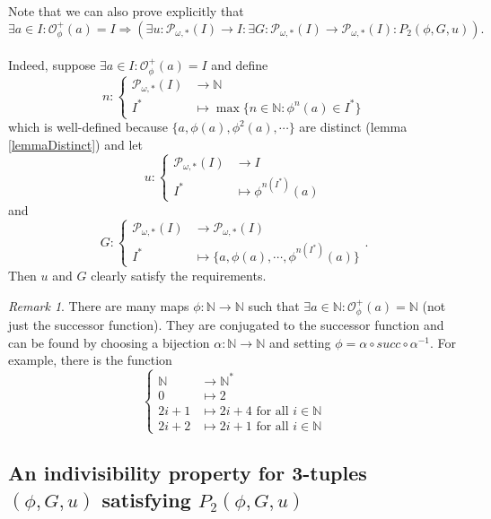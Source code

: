 \documentclass[a4paper,11pt]{article}
\theoremstyle{plain}
\theoremstyle{definition}
\theoremstyle{remark}
\newtheorem{remark}{Remark}[section]
\begin{document}
Note that we can also prove explicitly that 
\[ \exists a \in I : \mathcal{O}^{+}_\phi(a) = I \Rightarrow \left( \exists u : \mathcal{P}_{\omega,*}(I) \to I : \exists G : \mathcal{P}_{\omega,*}(I) \to \mathcal{P}_{\omega,*}(I) : P_2(\phi,G,u) \right). \] \\
Indeed, suppose $\exists a \in I : \mathcal{O}^{+}_\phi(a) = I$ and define
\[ n : \begin{cases} \mathcal{P}_{\omega,*}(I) &\to \mathbb{N} \\
                       I^* &\mapsto \max\{n \in \mathbb{N} : \phi^n(a) \in I^* \}
\end{cases} \]
which is well-defined because $\{a,\phi(a),\phi^2(a),\cdots\}$ are distinct (lemma \ref{lemmaDistinct}) and let 
\[ u : \begin{cases} \mathcal{P}_{\omega,*}(I) &\to I \\
                       I^* &\mapsto \phi^{n(I^*)}(a)
\end{cases} \]
and 
\[ G : \begin{cases} \mathcal{P}_{\omega,*}(I) &\to \mathcal{P}_{\omega,*}(I) \\
                       I^* &\mapsto \{a, \phi(a), \cdots, \phi^{n(I^*)}(a)\} 
\end{cases}. \]
Then $u$ and $G$ clearly satisfy the requirements.



\begin{remark}
There are many maps $\phi : \mathbb{N} \to \mathbb{N}$ such that $\exists a \in \mathbb{N} : \mathcal{O}^{+}_\phi(a) = \mathbb{N}$ (not just the successor function). They are conjugated to the successor function and can be found by choosing a bijection $\alpha : \mathbb{N} \to \mathbb{N}$ and setting $\phi = \alpha \circ succ \circ \alpha ^{-1}$. For example, there is the function
\[ \begin{cases} \mathbb{N} &\to \mathbb{N}^* \\
                                        0 &\mapsto 2 \\
                                   2i+1 &\mapsto 2i+4 \text{ for all } i \in \mathbb{N} \\
                                   2i+2 &\mapsto 2i+1 \text{ for all } i \in \mathbb{N}                
\end{cases} \]
\end{remark}




\subsection{An indivisibility property for 3-tuples $(\phi,G,u)$ satisfying $P_2(\phi,G,u)$}
\end{document}
